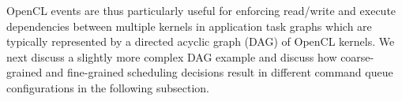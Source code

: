 	\par OpenCL events are thus particularly useful for enforcing read/write and execute dependencies between multiple kernels in application task graphs which are typically represented by a directed acyclic graph (DAG) of OpenCL kernels.  %
	We next discuss a slightly more complex DAG example and discuss how  coarse-grained and  fine-grained scheduling decisions result in different command queue configurations in the following subsection. 


